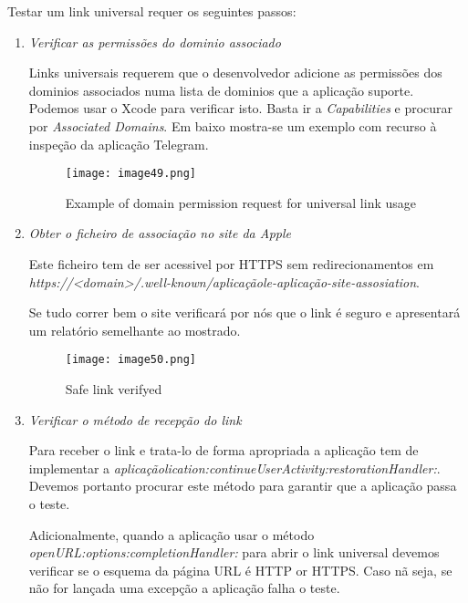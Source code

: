 Testar um link universal requer os seguintes passos:
\begin{enumerate}

\item \textit{Verificar as permissões do dominio associado}\par
\hfill\par
	Links universais requerem que o desenvolvedor adicione as permissões dos dominios associados numa lista de dominios que a aplicação suporte.
	Podemos usar o Xcode para verificar isto. Basta ir a \textit{Capabilities} e procurar por \textit{Associated Domains}. Em baixo mostra-se um exemplo com recurso à inspeção da aplicação Telegram.

\begin{figure}[H]
\centering
\texttt{[image: image49.png]}
\caption {Example of domain permission request for universal link usage}
\label {fig02}
\end{figure}

\item \textit{Obter o ficheiro de associação no site da Apple}\par
\hfill\par

	Este ficheiro tem de ser acessivel por HTTPS sem redirecionamentos em \textit{https://<domain>/.well-known/aplicaçãole-aplicação-site-assosiation}.

	Se tudo correr bem o site verificará por nós que o link é seguro e apresentará um relatório semelhante ao mostrado.

\begin{figure}[H]
\centering
\texttt{[image: image50.png]}
\caption {Safe link verifyed}
\label {fig02}
\end{figure}
	

\item \textit{Verificar o método de recepção do link}\par
\hfill\par

	Para receber o link e trata-lo de forma apropriada a aplicação tem de implementar a \textit{aplicaçãolication:continueUserActivity:restorationHandler:}. Devemos portanto procurar este método para garantir que a aplicação passa o teste.\par

	Adicionalmente, quando a aplicação usar o método \textit{openURL:options:completionHandler:} para abrir o link universal devemos verificar se o esquema da página URL é  HTTP or HTTPS. Caso nã seja, se não for lançada uma excepção a aplicação falha o teste.\par
\hfill\par


\end{enumerate}
